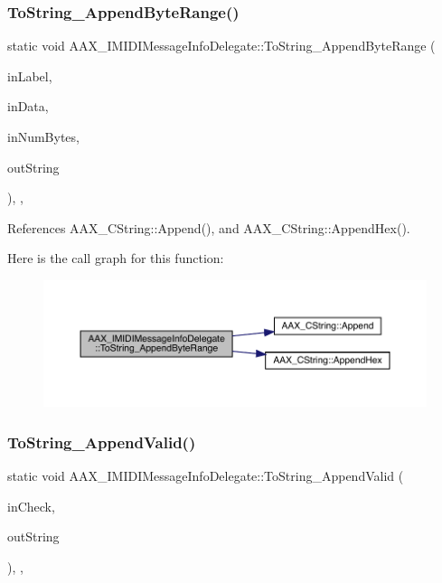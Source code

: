 \subsubsection{\texorpdfstring{ToString\_AppendByteRange()}{ToString\_AppendByteRange()}}
{\footnotesize\ttfamily static void A\+A\+X\+\_\+\+I\+M\+I\+D\+I\+Message\+Info\+Delegate\+::\+To\+String\+\_\+\+Append\+Byte\+Range (\begin{DoxyParamCaption}\item[{const char $\ast$}]{in\+Label,  }\item[{const uint8\+\_\+t $\ast$}]{in\+Data,  }\item[{int32\+\_\+t}]{in\+Num\+Bytes,  }\item[{\mbox{\hyperlink{a01573}{A\+A\+X\+\_\+\+C\+String}} \&}]{out\+String }\end{DoxyParamCaption})\hspace{0.3cm}{\ttfamily [inline]}, {\ttfamily [static]}, {\ttfamily [protected]}}



References A\+A\+X\+\_\+\+C\+String\+::\+Append(), and A\+A\+X\+\_\+\+C\+String\+::\+Append\+Hex().

Here is the call graph for this function\+:
\nopagebreak
\begin{figure}[H]
\begin{center}
\leavevmode
\includegraphics[width=350pt]{a01953_a459b5e82caa345b2d0e4f80d3d2a0a0b_cgraph}
\end{center}
\end{figure}
\mbox{\label{a01953_acf29d3b4be3defe93bb3fad8dda3e7ea}} 
\subsubsection{\texorpdfstring{ToString\_AppendValid()}{ToString\_AppendValid()}}
{\footnotesize\ttfamily static void A\+A\+X\+\_\+\+I\+M\+I\+D\+I\+Message\+Info\+Delegate\+::\+To\+String\+\_\+\+Append\+Valid (\begin{DoxyParamCaption}\item[{bool}]{in\+Check,  }\item[{\mbox{\hyperlink{a01573}{A\+A\+X\+\_\+\+C\+String}} \&}]{out\+String }\end{DoxyParamCaption})\hspace{0.3cm}{\ttfamily [inline]}, {\ttfamily [static]}, {\ttfamily [protected]}}



